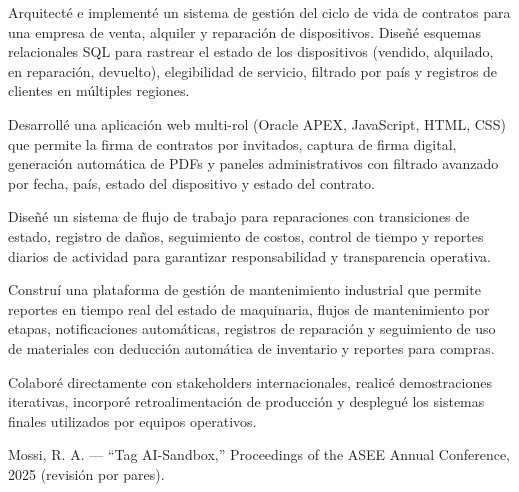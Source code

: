 \documentclass{../../../Styles/MS-Style}
\begin{document}
\begin{Form}
\begin{listBlock}
		\generalItem
		Arquitecté e implementé un sistema de gestión del ciclo de vida de contratos para una empresa de venta,
		alquiler y reparación de dispositivos. Diseñé esquemas relacionales SQL para rastrear el estado de los dispositivos
		(vendido, alquilado, en reparación, devuelto), elegibilidad de servicio, filtrado por país y registros de clientes en múltiples regiones.

		\generalItem
		Desarrollé una aplicación web multi-rol (Oracle APEX, JavaScript, HTML, CSS) que permite la firma de contratos
		por invitados, captura de firma digital, generación automática de PDFs y paneles administrativos con filtrado
		avanzado por fecha, país, estado del dispositivo y estado del contrato.

		\generalItem
		Diseñé un sistema de flujo de trabajo para reparaciones con transiciones de estado, registro de daños,
		seguimiento de costos, control de tiempo y reportes diarios de actividad para garantizar responsabilidad
		y transparencia operativa.

		\generalItem
		Construí una plataforma de gestión de mantenimiento industrial que permite reportes en tiempo real
		del estado de maquinaria, flujos de mantenimiento por etapas, notificaciones automáticas, registros de reparación
		y seguimiento de uso de materiales con deducción automática de inventario y reportes para compras.

		\generalItem
		Colaboré directamente con stakeholders internacionales, realicé demostraciones iterativas,
		incorporé retroalimentación de producción y desplegué los sistemas finales utilizados por equipos operativos.
	\end{listBlock}







	\begin{listBlock}
		\generalItem
		Mossi, R. A. — “Tag AI-Sandbox,” Proceedings of the ASEE Annual Conference, 2025 (revisión por pares).\cite{AITagResearchPublication}
	\end{listBlock}


\end{Form}
\end{document}
